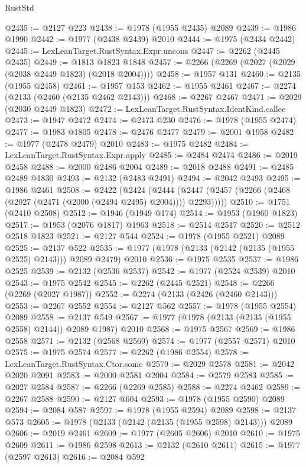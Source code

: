 \begin{lexlean}{RustStd}
\begin{coremodule}
@2435 := @2127 @223
@2438 := @1978 (@1955 @2435) @2089
@2439 := @1986 @1990
@2442 := @1977 (@2438 @2439) @2010
@2444 := @1975 (@2434 @2442)
@2445 := LexLeanTarget.RustSyntax.Expr.uncons
@2447 := @2262 (@2445 @2435)
@2449 := @1813 @1823 @1848
@2457 := @2266 (@2269 (@2027 (@2029 (@2038 @2449 @1823) (@2018 @2004))))
@2458 := @1957 @131
@2460 := @2135 (@1955 @2458)
@2461 := @1957 @153
@2462 := @1955 @2461
@2467 := @2274 (@2133 (@2460 (@2135 @2462 @2143)))
@2468 := @2267 @2467
@2471 := @2029 (@2030 @2449 @1823)
@2472 := LexLeanTarget.RustSyntax.IdentKind.callee
@2473 := @1947 @2472
@2474 := @2473 @230
@2476 := @1978 (@1955 @2474)
@2477 := @1983 @1805
@2478 := @2476 @2477
@2479 := @2001 @1958
@2482 := @1977 (@2478 @2479) @2010
@2483 := @1975 @2482
@2484 := LexLeanTarget.RustSyntax.Expr.apply
@2485 := @2484 @2474
@2486 := @2019 @2458
@2488 := @2000 @2486 @2004
@2489 := @2018 @2488
@2491 := @2485 @2489 @1830
@2493 := @2132 (@2483 @2491)
@2494 := @2042 @2493
@2495 := @1986 @2461
@2508 := @2422
    (@2424
      (@2444 (@2447 (@2457 (@2266 (@2468 (@2027 (@2471 (@2000 (@2494 @2495) @2004)))) @2293)))))
@2510 := @1751 (@2410 @2508)
@2512 := @1946 (@1949 @174)
@2514 := @1953 (@1960 @1823)
@2517 := @1953 (@2076 @1817) @1963
@2518 := @2514 @2517
@2520 := @2512 @2518 @1823
@2521 := @2127 @544
@2524 := @1978 (@1955 @2521) @2089
@2525 := @2137 @522
@2535 := @1977 (@1978 (@2133 (@2142 (@2135 (@1955 @2525) @2143))) @2089 @2479) @2010
@2536 := @1975 @2535
@2537 := @1986 @2525
@2539 := @2132 (@2536 @2537)
@2542 := @1977 (@2524 @2539) @2010
@2543 := @1975 @2542
@2545 := @2262 (@2445 @2521)
@2548 := @2266 (@2269 (@2027 @1987))
@2552 := @2274 (@2133 (@2426 (@2460 @2143)))
@2553 := @2267 @2552
@2554 := @2127 @562
@2557 := @1978 (@1955 @2554) @2089
@2558 := @2137 @549
@2567 := @1977 (@1978 (@2133 (@2135 (@1955 @2558) @2144)) @2089 @1987) @2010
@2568 := @1975 @2567
@2569 := @1986 @2558
@2571 := @2132 (@2568 @2569)
@2574 := @1977 (@2557 @2571) @2010
@2575 := @1975 @2574
@2577 := @2262 (@1986 @2554)
@2578 := LexLeanTarget.RustSyntax.Ctor.some
@2579 := @2029 @2578
@2581 := @2042 @2020 @2091
@2583 := @2000 @2581 @2004
@2584 := @2579 @2583
@2585 := @2027 @2584
@2587 := @2266 (@2269 @2585)
@2588 := @2274 @2462
@2589 := @2267 @2588
@2590 := @2127 @604
@2593 := @1978 (@1955 @2590) @2089
@2594 := @2084 @587
@2597 := @1978 (@1955 @2594) @2089
@2598 := @2137 @573
@2605 := @1978 (@2133 (@2142 (@2135 (@1955 @2598) @2143))) @2089
@2606 := @2019 @2461
@2609 := @1977 (@2605 @2606) @2010
@2610 := @1975 @2609
@2611 := @1986 @2598
@2613 := @2132 (@2610 @2611)
@2615 := @1977 (@2597 @2613)
@2616 := @2084 @592

\end{coremodule}
\end{lexlean}
